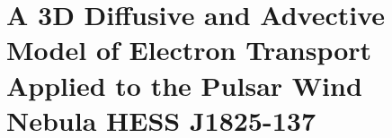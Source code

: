 \chapter{A 3D Diffusive and Advective Model of Electron Transport Applied to the Pulsar Wind Nebula HESS J1825-137} \label{sec:10_second_paper}
%


